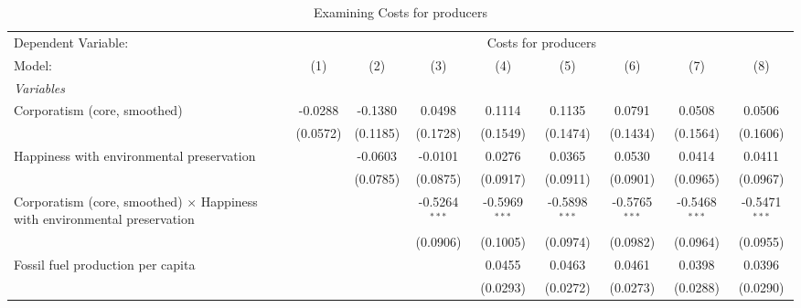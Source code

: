 
\begin{table}[htbp]
   \caption{Examining Costs for producers}
   \centering
   \begin{tabular}{lcccccccc}
      \tabularnewline \midrule \midrule
      Dependent Variable: & \multicolumn{8}{c}{Costs for producers}\\
      Model:                                                                           & (1)      & (2)      & (3)             & (4)             & (5)             & (6)             & (7)             & (8)\\  
      \midrule
      \emph{Variables}\\
      Corporatism (core, smoothed)                                                     & -0.0288  & -0.1380  & 0.0498          & 0.1114          & 0.1135          & 0.0791          & 0.0508          & 0.0506\\   
                                                                                       & (0.0572) & (0.1185) & (0.1728)        & (0.1549)        & (0.1474)        & (0.1434)        & (0.1564)        & (0.1606)\\   
      Happiness with environmental preservation                                        &          & -0.0603  & -0.0101         & 0.0276          & 0.0365          & 0.0530          & 0.0414          & 0.0411\\   
                                                                                       &          & (0.0785) & (0.0875)        & (0.0917)        & (0.0911)        & (0.0901)        & (0.0965)        & (0.0967)\\   
      Corporatism (core, smoothed) $\times$ Happiness with environmental preservation  &          &          & -0.5264$^{***}$ & -0.5969$^{***}$ & -0.5898$^{***}$ & -0.5765$^{***}$ & -0.5468$^{***}$ & -0.5471$^{***}$\\   
                                                                                       &          &          & (0.0906)        & (0.1005)        & (0.0974)        & (0.0982)        & (0.0964)        & (0.0955)\\   
      Fossil fuel production per capita                                                &          &          &                 & 0.0455          & 0.0463          & 0.0461          & 0.0398          & 0.0396\\   
                                                                                       &          &          &                 & (0.0293)        & (0.0272)        & (0.0273)        & (0.0288)        & (0.0290)\\   

\end{tabular}
\end{table}
